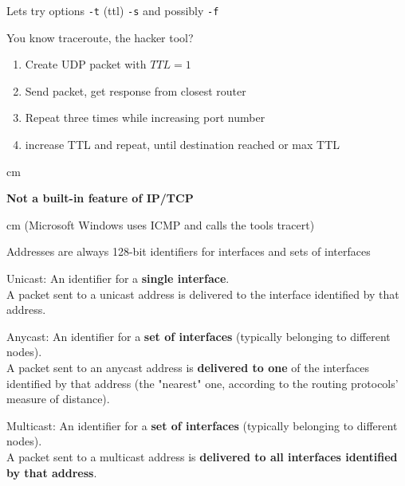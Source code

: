 \documentclass[Screen16to9,17pt]{foils}
\begin{document}
Lets try options \verb+-t+ (ttl) \verb+-s+ and possibly \verb+-f+






You know traceroute, the hacker tool?

\begin{enumerate}
\item Create UDP packet with $TTL = 1$
\item Send packet, get response from closest router
\item Repeat three times while increasing port number
\item increase TTL and repeat, until destination reached or max TTL
\end{enumerate}
 cm

\centerline{\Large\bf Not a built-in feature of IP/TCP}
 cm
(Microsoft Windows uses ICMP and calls the tools tracert)




\begin{list1}
\item Addresses are always 128-bit identifiers for interfaces and sets of
   interfaces
\item Unicast:   An identifier for a {\bf single interface}.\\
A packet sent to a
               unicast address is delivered to the interface identified
               by that address.
\item Anycast:   An identifier for a {\bf set of interfaces} (typically
               belonging to different nodes).\\  A packet sent to an
               anycast address is {\bf delivered to one} of the interfaces
               identified by that address (the "nearest" one, according
               to the routing protocols' measure of distance).

\item Multicast: An identifier for a {\bf set of interfaces} (typically
               belonging to different nodes). \\ A packet sent to a
               multicast address is {\bf delivered to all interfaces
               identified by that address}.
\end{list1}
\end{document}
